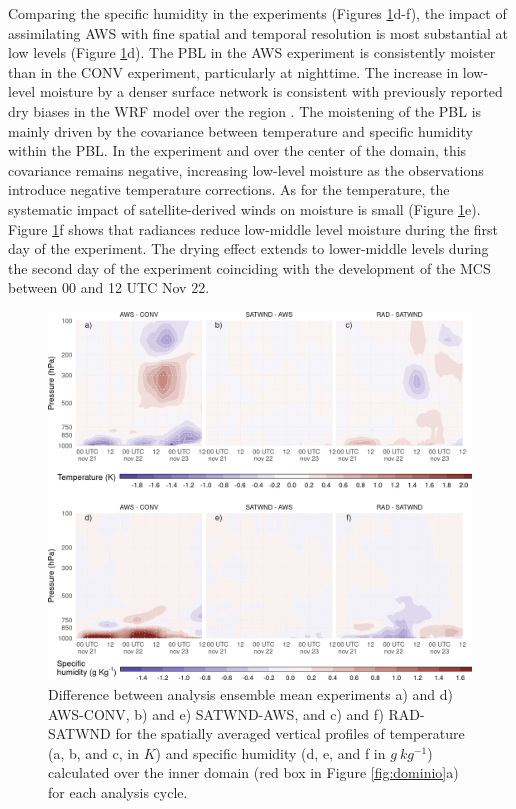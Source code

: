 \documentclass[final,5p,times,twocolumn,authoryear]{elsarticle} %
\begin{document}
Comparing the specific humidity in the experiments (Figures \ref{fig:TQ-diff}d-f), the impact of assimilating AWS with fine spatial and temporal resolution is most substantial at low levels (Figure \ref{fig:TQ-diff}d). The PBL in the AWS experiment is consistently moister than in the CONV experiment, particularly at nighttime. The increase in low-level moisture by a denser surface network is consistent with previously reported dry biases in the WRF model over the region \citep[\citet{matsudo2021}, \citet{ruiz2010}]{casaretto2022}. The moistening of the PBL is mainly driven by the covariance between temperature and specific humidity within the PBL. In the experiment and over the center of the domain, this covariance remains negative, increasing low-level moisture as the observations introduce negative temperature corrections. As for the temperature, the systematic impact of satellite-derived winds on moisture is small (Figure \ref{fig:TQ-diff}e). Figure \ref{fig:TQ-diff}f shows that radiances reduce low-middle level moisture during the first day of the experiment. The drying effect extends to lower-middle levels during the second day of the experiment coinciding with the development of the MCS between 00 and 12 UTC Nov 22.



\begin{figure}[ht]

{\centering \includegraphics{../figures/TQ-diff-1} 

}

\caption{Difference between analysis ensemble mean experiments a) and d) AWS-CONV, b) and e) SATWND-AWS, and c) and f) RAD-SATWND for the spatially averaged vertical profiles of temperature (a, b, and c, in \(K\)) and specific humidity (d, e, and f in \(g\ kg^{-1}\)) calculated over the inner domain (red box in Figure \ref{fig:dominio}a) for each analysis cycle.}\label{fig:TQ-diff}
\end{figure}
\end{document}
